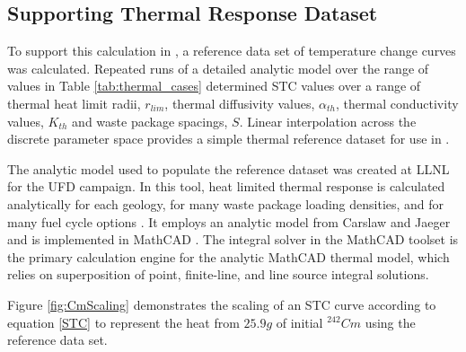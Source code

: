 \subsection{Supporting Thermal Response Dataset}
To support this calculation in \Cyder , a reference data set of temperature change 
curves was calculated. Repeated runs of a detailed analytic model over the range of values in Table 
\ref{tab:thermal_cases} determined \gls{STC} values over a range of thermal 
heat limit radii, $r_{lim}$, thermal diffusivity values, $\alpha_{th}$,
thermal conductivity values, $K_{th}$ and waste package spacings, $S$. Linear 
interpolation across the discrete parameter space provides a simple thermal 
reference dataset for use in \Cyder .



The analytic model used to populate the reference dataset was created at 
\gls{LLNL} for the \gls{UFD} campaign. In this tool, heat limited thermal 
response is calculated analytically for each geology, for many waste package 
loading densities, and for many fuel cycle options \cite{hardin_generic_2011, 
greenberg_investigations_2012, greenberg_application_2012}. It employs an 
analytic model from Carslaw and Jaeger and is implemented in MathCAD 
\cite{carslaw_conduction_1959, ptc_mathcad_2010}.  The integral solver in the 
MathCAD toolset is the primary calculation engine for the analytic MathCAD 
thermal model, which relies on superposition of point, finite-line, and line 
source integral solutions.  

%

Figure \ref{fig:CmScaling} demonstrates the scaling of an STC curve according to 
equation \eqref{STC} to represent the heat from $25.9g$ of initial $^{242}Cm$ using 
the reference data set. 

